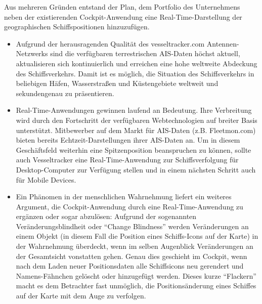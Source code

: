 Aus mehreren Gründen entstand der Plan, dem Portfolio des Unternehmens neben der existierenden Cockpit-Anwendung eine Real-Time-Darstellung der geographischen Schiffspositionen hinzuzufügen.
\begin{itemize}

\item Aufgrund der herausragenden Qualität des vesseltracker.com Antennen-Netzwerks sind die verfügbaren terrestrischen AIS-Daten höchst aktuell, aktualisieren sich kontinuierlich und erreichen eine hohe weltweite Abdeckung des Schiffsverkehrs. Damit ist es möglich, die Situation des Schiffsverkehrs in beliebigen Häfen, Wasserstraßen und Küstengebiete weltweit und sekundengenau zu präsentieren. 

\item Real-Time-Anwendungen gewinnen laufend an Bedeutung. Ihre Verbreitung wird durch den Fortschritt der verfügbaren Webtechnologien auf breiter Basis unterstützt. Mitbewerber auf dem Markt für AIS-Daten (z.B. Fleetmon.com) bieten bereits Echtzeit-Darstellungen ihrer AIS-Daten an. Um in diesem Geschäftsfeld weiterhin eine Spitzenposition beanspruchen zu können, sollte auch Vesseltracker eine Real-Time-Anwendung zur Schiffsverfolgung für Desktop-Computer zur Verfügung stellen und in einem nächsten Schritt auch für Mobile Devices.
\item Ein Phänomen in der menschlichen Wahrnehmung liefert ein weiteres Argument, die Cockpit-Anwendung durch eine Real-Time-Anwendung zu ergänzen oder sogar abzulösen: Aufgrund der sogenannten Veränderungsblindheit oder “Change Blindness” werden Veränderungen an einem Objekt (in diesem Fall die Position eines Schiffs-Icons auf der Karte) in der Wahrnehmung überdeckt, wenn im selben Augenblick Veränderungen an der Gesamtsicht vonstatten gehen. Genau dies geschieht im Cockpit, wenn nach dem Laden neuer Positionsdaten alle Schiffsicons neu gerendert und Namens-Fähnchen gelöscht oder hinzugefügt werden. Dieses kurze “Flackern” macht es dem Betrachter fast unmöglich, die Positionsänderung eines Schiffes auf der Karte mit dem Auge zu verfolgen.
  

\end{itemize}


